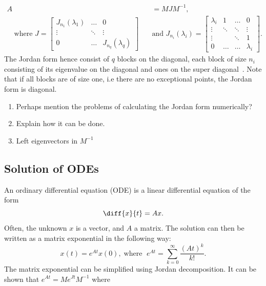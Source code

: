 \documentclass[../main.tex]{subfiles}
\begin{document}
\begin{equation}\label{eq:jordan}
\begin{aligned}
    A &= MJM^{-1}, \\ \quad \text{where } J = \begin{bmatrix}J_{n_1}(\lambda_1) & \dots & 0 \\
                                                         \vdots & \ddots & \vdots \\
                                                         0 & \dots &  J_{n_q}(\lambda_q)\end{bmatrix} \quad
      &\text{and } J_{n_i}(\lambda_i) = \begin{bmatrix} \lambda_i & 1 & \dots & 0 \\
                                                                                        \vdots  & \ddots & \ddots & \vdots \\
                                                                                        \vdots & & \ddots& 1 \\
                                                                                        0 & \dots & \dots & \lambda_i\end{bmatrix}.
\end{aligned}
\end{equation}
The Jordan form hence consist of $q$ blocks on the diagonal, each block of size $n_i$ consisting of its eigenvalue on the diagonal and ones on the super diagonal~\cite{uffe}. Note that if all blocks are of size one, i.e there are no exceptional points, the Jordan form is diagonal.
\begin{enumerate}
    \item Perhaps mention the problems of calculating the Jordan form numerically?
    \item Explain how it can be done.
    \item Left eigenvectors in $M^{-1}$
\end{enumerate}

\subsection{Solution of ODEs}
An ordinary differential equation (ODE) is a linear differential equation of the form
\begin{equation}
    \diff{x}{t}=Ax. 
\end{equation}
Often, the unknown $x$ is a vector, and $A$ a matrix. The solution can then be written as a matrix exponential in the following way:
\begin{equation}
    x(t) = e^{At}x(0), \;\text{where } \;e^{At} = \sum_{k=0}^{\infty}\frac{(At)^k}{k!}.
\end{equation}
The matrix exponential can be simplified using Jordan decomposition. It can be shown that  $e^{At} = Me^{Jt}M^{-1}$ where 
\end{document}
